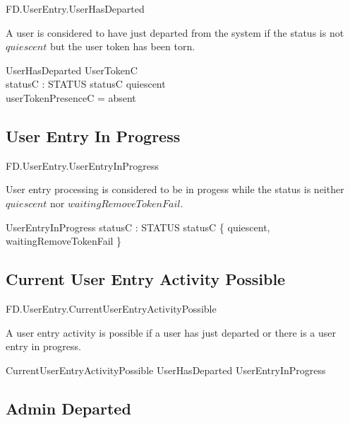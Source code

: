 \begin{traceunit}{FD.UserEntry.UserHasDeparted}
\end{traceunit}


A user is considered to have just departed from the system
if the status is not $quiescent$ but the user token has been torn.

\begin{schema}{UserHasDeparted}
        UserTokenC
\\      statusC : STATUS
\where
        statusC \neq quiescent
\\      userTokenPresenceC = absent
\end{schema}

\subsection{User Entry In Progress}

\begin{traceunit}{FD.UserEntry.UserEntryInProgress}
\end{traceunit}

User entry processing is considered to be in progess while the status
is neither $quiescent$ nor $waitingRemoveTokenFail$.

\begin{schema}{UserEntryInProgress}
        statusC : STATUS
\where
        statusC \notin \{ quiescent, waitingRemoveTokenFail \}
\end{schema}


\subsection{Current User Entry Activity Possible}

\begin{traceunit}{FD.UserEntry.CurrentUserEntryActivityPossible}
\end{traceunit}

A user entry activity is possible if a user has just departed or
there is a user entry in progress.

\begin{zed}
        CurrentUserEntryActivityPossible 
        UserHasDeparted \lor UserEntryInProgress
\end{zed}



\subsection{Admin Departed}

